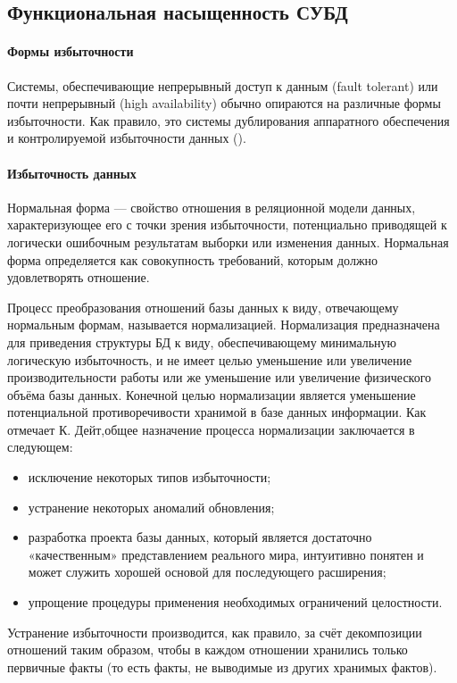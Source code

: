 \subsection{Функциональная насыщенность СУБД}
\paragraph{Формы избыточности}
Системы, обеспечивающие непрерывный доступ к данным (fault tolerant) или почти
непрерывный (high availability) обычно опираются на различные формы избыточности.
Как правило, это системы дублирования аппаратного обеспечения и контролируемой
избыточности данных (\autocite{Baron}).

\paragraph{Избыточность данных}
Нормальная форма — свойство отношения в реляционной модели данных, характеризующее его с точки зрения избыточности, потенциально приводящей к логически ошибочным результатам выборки или изменения данных. Нормальная форма определяется как совокупность требований, которым должно удовлетворять отношение.

Процесс преобразования отношений базы данных к виду, отвечающему нормальным формам, называется нормализацией. Нормализация предназначена для приведения структуры БД к виду, обеспечивающему минимальную логическую избыточность, и не имеет целью уменьшение или увеличение производительности работы или же уменьшение или увеличение физического объёма базы данных. Конечной целью нормализации является уменьшение потенциальной противоречивости хранимой в базе данных информации. Как отмечает К. Дейт,общее назначение процесса нормализации заключается в следующем:
\begin{itemize}
    \item исключение некоторых типов избыточности;
    \item устранение некоторых аномалий обновления;
    \item разработка проекта базы данных, который является достаточно «качественным» представлением реального мира, интуитивно понятен и может служить хорошей основой для последующего расширения;
    \item упрощение процедуры применения необходимых ограничений целостности.
\end{itemize}

Устранение избыточности производится, как правило, за счёт декомпозиции отношений таким образом, чтобы в каждом отношении хранились только первичные факты (то есть факты, не выводимые из других хранимых фактов). \\

